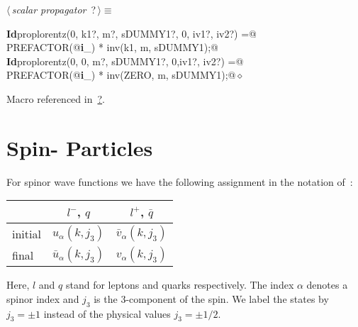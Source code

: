 \documentclass[a4paper,12pt]{amsart}
\renewcommand{\NWtarget}[2]{\hypertarget{#1}{#2}}
\renewcommand{\NWlink}[2]{\hyperlink{#1}{#2}}
\renewcommand{\NWtxtMacroRefIn}{Macro referenced in}
\renewcommand{\NWsep}{${\diamond}$}
\begin{document}
\begin{flushleft} \small
\begin{minipage}{\linewidth}\label{scrap5}\raggedright\small
\NWtarget{nuweb?}{} $\langle\,${\it scalar propagator}\nobreak\ {\footnotesize {?}}$\,\rangle\equiv$
\vspace{-1ex}
\begin{list}{}{} \item
\mbox{}\verb@@\hbox{\sffamily\bfseries Id}\verb@ proplorentz(0, k1?, m?, sDUMMY1?, 0, iv1?, iv2?) =@\\
\mbox{}\verb@   PREFACTOR(@\hbox{\sffamily\bfseries i}\verb@_) * inv(k1, m, sDUMMY1);@\\
\mbox{}\verb@@\hbox{\sffamily\bfseries Id}\verb@ proplorentz(0, 0, m?, sDUMMY1?, 0,iv1?, iv2?) =@\\
\mbox{}\verb@   PREFACTOR(@\hbox{\sffamily\bfseries i}\verb@_) * inv(ZERO, m, sDUMMY1);@{\NWsep}
\end{list}
\vspace{-1.5ex}
\footnotesize
\begin{list}{}{\setlength{\itemsep}{-\parsep}\setlength{\itemindent}{-\leftmargin}}
\item \NWtxtMacroRefIn\ \NWlink{nuweb?}{?}.

\item{}
\end{list}
\end{minipage}\vspace{4ex}
\end{flushleft}

\section{Spin-\texorpdfstring{}{1/2} Particles}
For spinor wave functions we have the following assignment in the
notation of~\cite{1}:
\begin{center}
\begin{tabular}{l|cc}
     &     $l^-$, $q$ & $l^+$, $\bar{q}$\\
\hline
initial & $u_\alpha(k, j_3)$ & $\bar{v}_\alpha(k, j_3)$ \\
final & $\bar{u}_\alpha(k, j_3)$ & $v_\alpha(k, j_3)$
\end{tabular}
\end{center}
Here, $l$ and $q$ stand for leptons and quarks respectively.
The index $\alpha$ denotes a spinor index and $j_3$ is the 3-component
of the spin.
We label the states by $j_3=\pm1$ instead of the physical values
$j_3=\pm1/2$.
\end{document}

